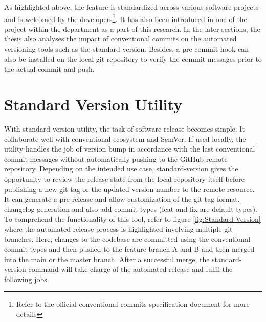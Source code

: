 \vspace{0.5cm}
\lstset{style=mystyle}

\vspace{0.5cm}

As highlighted above, the feature is standardized across various software projects and is welcomed by the developers\footnote{Refer to the official conventional commits specification document for more details}. It has also been introduced in one of the project within the department as a part of this research. In the later sections, the thesis also analyses the impact of conventional commits on the automated versioning tools such as the standard-version. Besides, a pre-commit hook can also be installed on the local git repository to verify the commit messages prior to the actual commit and push.  


\section{Standard Version Utility}\label{section:Standard-Version}

With standard-version utility, the task of software release becomes simple. It collaborate well with conventional ecosystem and \ac{SemVer}. If used locally, the utility handles the job of version bump in accordance with the last conventional commit messages without automatically pushing to the GitHub remote repository. Depending on the intended use case, standard-version gives the opportunity to review the release state from the local repository itself before publishing a new git tag or the updated version number to the remote resource. It can generate a pre-release and allow customization of the git tag format, changelog generation and also add commit types (feat and fix are default types). To comprehend the functionality of this tool, refer to figure \ref{fig:Standard-Version} where the automated release process is highlighted involving multiple git branches. Here, changes to the codebase are committed using the conventional commit types and then pushed to the feature branch A and B and then merged into the main or the master branch. After a successful merge, the standard-version command will take charge of the automated release and fulfil the following jobs. 

